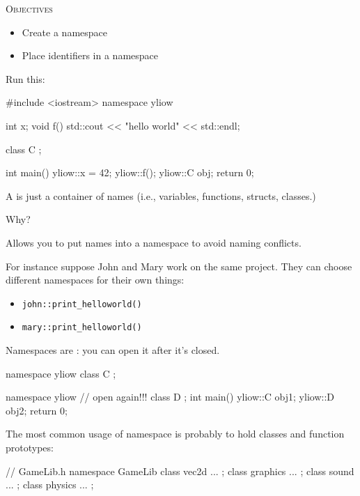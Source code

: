 \newpage{}

\textsc{Objectives}

\begin{itemize}
\item
  Create a namespace
\item
  Place identifiers in a namespace
\end{itemize}

\newpage{}

Run this:
\begin{console}
#include <iostream>
namespace yliow
{    
     int x;
     void f()
     {    
          std::cout << "hello world" <<
          std::endl;
     }
     
     class C
     {};
}

int main()
{   
    yliow::x = 42;
    yliow::f();
    yliow::C obj;
    return 0;
}
 
\end{console}

A  is just a container of names (i.e., variables, functions, structs, classes.)

Why?

Allows you to put names into a namespace to avoid naming conflicts.

For instance suppose John and Mary work on the same project. They can choose different namespaces for their own things:

\begin{itemize}
\item
  \verb!john::print_helloworld()!
\item
  \verb!mary::print_helloworld()!
\end{itemize}

\newpage{}

Namespaces are : you can open it after it's closed.
\begin{console}
namespace yliow
{    
     class C
     {};
}

namespace yliow // open again!!!
{    
     class D
     {};
}
int main()
{   
     yliow::C obj1;
     yliow::D obj2;
     return 0;
}
 
\end{console}

The most common usage of namespace is probably to hold classes and function prototypes:

\begin{console}
// GameLib.h
namespace GameLib
{    
     class vec2d { ... };
     class graphics { ... };
     class sound { ... }; 
     class physics { ... };
}
               
\end{console}

